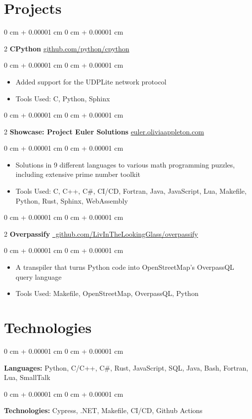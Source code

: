 \documentclass[10pt, letterpaper]{article}
\newenvironment{highlights}{ \begin{itemize}[ topsep=0.10 cm, parsep=0.10 cm, partopsep=0pt,
itemsep=0pt, leftmargin=0 cm + 10pt ] }{ \end{itemize} } %
\newenvironment{onecolentry}{ \begin{adjustwidth}{ 0 cm + 0.00001 cm }{ 0 cm + 0.00001 cm }
}{ \end{adjustwidth} } %
\newenvironment{twocolentry}[2][]{ \onecolentry \def\secondColumn{#2} \setcolumnwidth{\fill, 4.5 cm}
\begin{paracol}{2} }{ \switchcolumn \raggedleft \secondColumn \end{paracol}
\endonecolentry } %
\begin{document}
	\section{Projects}

	\begin{twocolentry}
		{ \href{https://github.com/python/cpython}{github.com/python/cpython} } \textbf{CPython}
	\end{twocolentry}

	\begin{onecolentry}
		\begin{highlights}
			\item Added support for the UDPLite network protocol \item Tools Used: C, Python,
			Sphinx
		\end{highlights}
	\end{onecolentry}

	\vspace{0.2 cm}

	\begin{twocolentry}
		{ \href{https://euler.oliviaappleton.com}{euler.oliviaappleton.com} } \textbf{Showcase:
		Project Euler Solutions}
	\end{twocolentry}

	\begin{onecolentry}
		\begin{highlights}
			\item Solutions in 9 different languages to various math programming puzzles, including extensive prime number toolkit
			\item Tools Used: C, C+\!+, C\#, CI/CD, Fortran, Java, JavaScript, Lua,
			Makefile, Python, Rust, Sphinx, WebAssembly
		\end{highlights}
	\end{onecolentry}

	\vspace{0.2 cm}

	\begin{twocolentry}
		{ \href{https://github.com/LivInTheLookingGlass/overpassify}{ \mbox{\hspace{-100pt} github.com/LivInTheLookingGlass/overpassify}} } \textbf{Overpassify}
	\end{twocolentry}

	\begin{onecolentry}
		\begin{highlights}
			\item A transpiler that turns Python code into OpenStreetMap's OverpassQL query language
			\item Tools Used: Makefile, OpenStreetMap, OverpassQL, Python
		\end{highlights}
	\end{onecolentry}

	\section{Technologies}

	\begin{onecolentry}
		\textbf{Languages:} Python, C/C+\!+, C\#, Rust, JavaScript, SQL, Java, Bash,
		Fortran, Lua, SmallTalk
	\end{onecolentry}

	\begin{onecolentry}
		\textbf{Technologies:} Cypress, .NET, Makefile, CI/CD, Github Actions
	\end{onecolentry}
\end{document}
